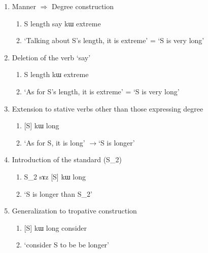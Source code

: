 \documentclass[oldfontcommands,oneside,a4paper,11pt]{article}
\newcommand{\ipa}[1]{{\phon #1}} %
\begin{document}
\begin{enumerate} 
\item Manner $\Rightarrow$ Degree construction
\begin{enumerate} 
\item S length say \ipa{kɯ} extreme 
\item `Talking about S's length, it is extreme' = `S is very long'
\end{enumerate} 
\item Deletion of the verb `say'
\begin{enumerate} 
\item S length \ipa{kɯ} extreme 
\item `As for S's length, it is extreme' = `S is very long'
\end{enumerate} 
\item Extension to stative verbs other than those expressing degree
\begin{enumerate} 
\item{} [S] \ipa{kɯ} long  
\item `As for S, it is long' $\rightarrow$`S is longer'  
\end{enumerate} 
\item Introduction of the standard (S_2)
\begin{enumerate} 
\item{} S_2 \ipa{sɤz} [S] \ipa{kɯ} long  
\item  `S is longer than S_2'
\end{enumerate} 
\item Generalization to tropative construction
\begin{enumerate} 
\item{}  [S] \ipa{kɯ} long  consider  
\item  `consider S to be be longer'
\end{enumerate}  
\end{enumerate}
\end{document}

